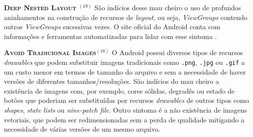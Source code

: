 

  \noindent
  \textbf{\textsc{{\small Deep Nested Layout
}}}$^{(19)}$
      São indícios desse mau cheiro o uso de profundos aninhamentos na construção de recursos de \textit{layout}, ou seja, \textit{ViewGroups} contendo outros \textit{ViewGroups} sucessivas vezes. O site oficial do Android conta com informações e ferramentas automatizadas para lidar com esse sintoma \cite{OptmizingViewHierarchies}.


  \noindent
  \textbf{\textsc{{\small Avoid Tradicional Images}}}$^{(18)}$
      O Android possui diversos tipos de recursos \textit{drawables} que podem substituir imagens tradicionais como \texttt{.png}, \texttt{.jpg} ou \texttt{.gif} a um custo menor em termos de tamanho do arquivo e sem a necessidade de haver versões de diferentes tamanhos/resoluções. São indícios do mau cheiro a existência de imagens com, por exemplo, cores sólidas, degradês ou estado de botões que poderiam ser substituídas por recursos \textit{drawables} de outros tipos como \textit{shapes}, \textit{state lists} ou \textit{nine-patch file}. Outro sintoma é a não existência de imagens vetoriais, que podem ser redimensionadas sem a perda de qualidade mitigando a necessidade de várias versões de um mesmo arquivo.


